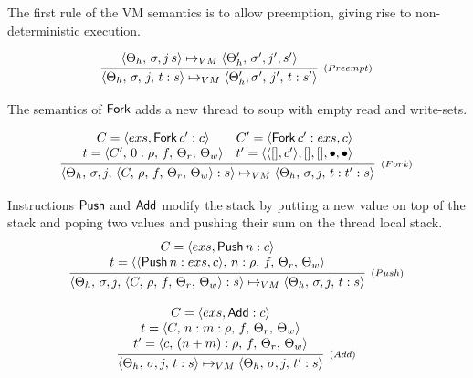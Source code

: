 \documentclass[sigplan, anonymous, review]{acmart}
\theoremstyle{definition}
\newcommand{\C}[1]{\red{\mathsf{#1}}}
\begin{document}
The first rule of the VM semantics is to allow preemption, giving rise to non-deterministic execution.

\[
   \infer[_{(Preempt)}]
         {\langle \Theta_h,\,\sigma,\,j,\, t : s \rangle \mapsto_{VM} \langle \Theta_h',\sigma',\,j',\,t : s' \rangle}
         {\langle \Theta_h,\,\sigma,j\,s\rangle \mapsto_{VM} \langle \Theta_h',\,\sigma',j',s'\rangle}
\]

The semantics of \ensuremath{\C{Fork}} adds a new thread to soup with empty read and write-sets.

\[
  \infer[_{(Fork)}]
        { \langle \Theta_h,\,\sigma,j,\,\langle C,\,\rho,\,f,\,\Theta_r,\,\Theta_w\rangle:s\rangle\mapsto_{VM}
          \langle \Theta_h,\,\sigma,j,\,t:t':s\rangle }
        { \begin{array}{cc}
            C = \langle exs, \ensuremath{\C{Fork}}\,c' : c\rangle & C' = \langle \ensuremath{\C{Fork}}\,c' : exs,c\rangle \\
            t = \langle C',\,0:\rho,\,f,\,\Theta_r,\,\Theta_w\rangle & t' = \langle \langle [], c' \rangle, [],[], \bullet,\bullet\rangle \\
          \end{array}}
\]

Instructions \ensuremath{\C{Push}} and \ensuremath{\C{Add}} modify the stack by putting a new value on top of the stack and poping two values and
pushing their sum on the thread local stack.
\[
  \begin{array}{c}
     \infer[_{(Push)}]
           {\langle \Theta_h,\,\sigma,j,\,\langle C,\,\rho,\,f,\,\Theta_r,\,\Theta_w\rangle : s\rangle\mapsto_{VM}
            \langle \Theta_h,\,\sigma,j,\,t : s \rangle}
           {\begin{array}{c}
               C = \langle exs, \ensuremath{\C{Push}}\,n:c\rangle \\
               t = \langle \langle \ensuremath{\C{Push}}\, n : exs, c\rangle ,\,n:\rho,\,f,\,\Theta_r,\,\Theta_w\rangle 
            \end{array}} \\ \\
     \infer[_{(Add)}]
           {\langle \Theta_h,\,\sigma,j,\, t: s\rangle\mapsto_{VM}
            \langle \Theta_h,\,\sigma,j,\,t' : s \rangle}
           {\begin{array}{c}
              C = \langle exs, \ensuremath{\C{Add}} : c \rangle \\
              t = \langle C,\,n:m:\rho,\,f,\,\Theta_r,\,\Theta_w\rangle \\ 
              t' = \langle c,\, (n + m) : \rho,\,f,\,\Theta_r,\,\Theta_w\rangle
            \end{array}} 
  \end{array}
\]
\end{document}
